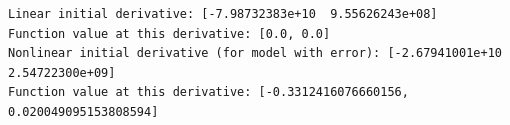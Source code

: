 \documentclass[11pt]{article}
\begin{document}
    \begin{Verbatim}[commandchars=\\\{\}]
Linear initial derivative: [-7.98732383e+10  9.55626243e+08]
Function value at this derivative: [0.0, 0.0]
Nonlinear initial derivative (for model with error): [-2.67941001e+10
2.54722300e+09]
Function value at this derivative: [-0.3312416076660156, 0.020049095153808594]
    \end{Verbatim}

    \begin{center}
    \end{center}
    { \hspace*{\fill} \\}
    
    \begin{center}
    \end{center}
    { \hspace*{\fill} \\}
    
\end{document}
